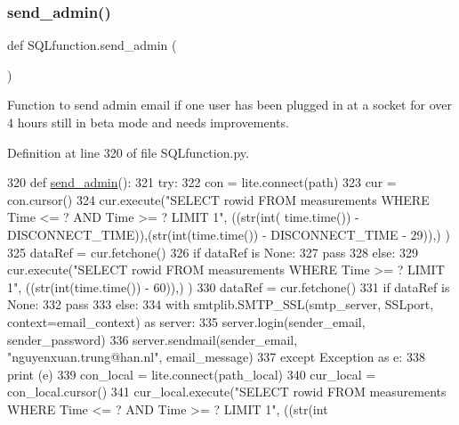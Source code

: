 \subsubsection{\texorpdfstring{send\+\_\+admin()}{send\_admin()}}
{\footnotesize\ttfamily def S\+Q\+Lfunction.\+send\+\_\+admin (\begin{DoxyParamCaption}{ }\end{DoxyParamCaption})}



Function to send admin email if one user has been plugged in at a socket for over 4 hours still in beta mode and needs improvements. 



Definition at line 320 of file S\+Q\+Lfunction.\+py.


\begin{DoxyCode}
320 \textcolor{keyword}{def }\hyperlink{namespace_s_q_lfunction_a75af8b1bb1aa60f32418ac7901b0060b}{send\_admin}():
321     \textcolor{keywordflow}{try}:
322         con = lite.connect(path)
323         cur = con.cursor()
324         cur.execute(\textcolor{stringliteral}{"SELECT rowid FROM measurements WHERE Time <= ? AND Time >= ? LIMIT 1"}, ((str(int(
      time.time()) - DISCONNECT\_TIME)),(str(int(time.time()) - DISCONNECT\_TIME - 29)),) )
325         dataRef = cur.fetchone()
326         \textcolor{keywordflow}{if} dataRef \textcolor{keywordflow}{is} \textcolor{keywordtype}{None}:
327             \textcolor{keywordflow}{pass}
328         \textcolor{keywordflow}{else}:
329             cur.execute(\textcolor{stringliteral}{"SELECT rowid FROM measurements WHERE Time >= ? LIMIT 1"}, ((str(int(time.time()) - 
      60)),) )
330             dataRef = cur.fetchone()
331             \textcolor{keywordflow}{if} dataRef \textcolor{keywordflow}{is} \textcolor{keywordtype}{None}:
332                 \textcolor{keywordflow}{pass}
333             \textcolor{keywordflow}{else}:
334                 with smtplib.SMTP\_SSL(smtp\_server, SSLport, context=email\_context) \textcolor{keyword}{as} server:
335                     server.login(sender\_email, sender\_password)                    
336                     server.sendmail(sender\_email, \textcolor{stringliteral}{"nguyenxuan.trung@han.nl"}, email\_message)
337     \textcolor{keywordflow}{except} Exception \textcolor{keyword}{as} e:
338         \textcolor{keywordflow}{print} (e)
339         con\_local = lite.connect(path\_local)
340         cur\_local = con\_local.cursor()
341         cur\_local.execute(\textcolor{stringliteral}{"SELECT rowid FROM measurements WHERE Time <= ? AND Time >= ? LIMIT 1"}, ((str(int

\end{DoxyCode}
